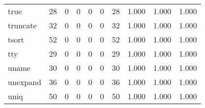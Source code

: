 \begin{longtable}{lp{1.3cm}p{1.3cm}p{1.3cm}p{1.3cm}p{1.3cm}p{1.3cm}p{1.3cm}p{1.3cm}p{1.3cm}}
true      &                     28 &                                             0 &                                            0 &                                           0 &                                            0 &                                         28 &                                1.000 &                                  1.000 &                                1.000 \\
truncate  &                     32 &                                             0 &                                            0 &                                           0 &                                            0 &                                         32 &                                1.000 &                                  1.000 &                                1.000 \\
tsort     &                     52 &                                             0 &                                            0 &                                           0 &                                            0 &                                         52 &                                1.000 &                                  1.000 &                                1.000 \\
tty       &                     29 &                                             0 &                                            0 &                                           0 &                                            0 &                                         29 &                                1.000 &                                  1.000 &                                1.000 \\
uname     &                     30 &                                             0 &                                            0 &                                           0 &                                            0 &                                         30 &                                1.000 &                                  1.000 &                                1.000 \\
unexpand  &                     36 &                                             0 &                                            0 &                                           0 &                                            0 &                                         36 &                                1.000 &                                  1.000 &                                1.000 \\
uniq      &                     50 &                                             0 &                                            0 &                                           0 &                                            0 &                                         50 &                                1.000 &                                  1.000 &                                1.000 \\

\end{longtable}
